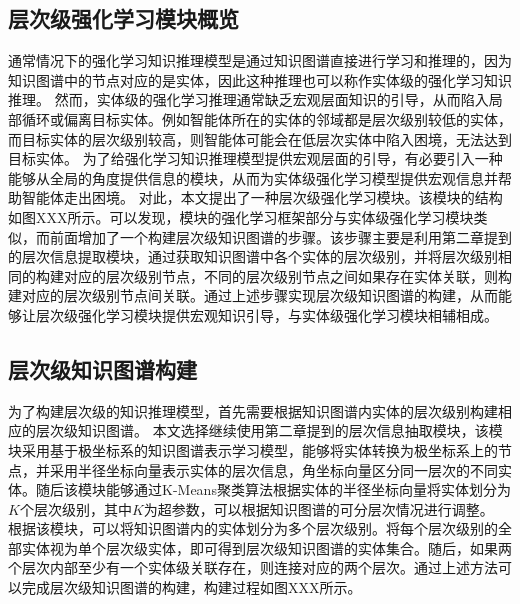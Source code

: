 \documentclass[algorithmlist, AutoFakeBold, AutoFakeSlant, figurelist, tablelist, nomlist, masters]{seuthesix}
\begin{document}
\subsection{层次级强化学习模块概览}
通常情况下的强化学习知识推理模型是通过知识图谱直接进行学习和推理的，因为知识图谱中的节点对应的是实体，因此这种推理也可以称作实体级的强化学习知识推理。
然而，实体级的强化学习推理通常缺乏宏观层面知识的引导，从而陷入局部循环或偏离目标实体。例如智能体所在的实体的邻域都是层次级别较低的实体，而目标实体的层次级别较高，则智能体可能会在低层次实体中陷入困境，无法达到目标实体。
为了给强化学习知识推理模型提供宏观层面的引导，有必要引入一种能够从全局的角度提供信息的模块，从而为实体级强化学习模型提供宏观信息并帮助智能体走出困境。
对此，本文提出了一种层次级强化学习模块。该模块的结构如图XXX所示。可以发现，模块的强化学习框架部分与实体级强化学习模块类似，而前面增加了一个构建层次级知识图谱的步骤。该步骤主要是利用第二章提到的层次信息提取模块，通过获取知识图谱中各个实体的层次级别，并将层次级别相同的构建对应的层次级别节点，不同的层次级别节点之间如果存在实体关联，则构建对应的层次级别节点间关联。通过上述步骤实现层次级知识图谱的构建，从而能够让层次级强化学习模块提供宏观知识引导，与实体级强化学习模块相辅相成。

\subsection{层次级知识图谱构建}
为了构建层次级的知识推理模型，首先需要根据知识图谱内实体的层次级别构建相应的层次级知识图谱。
本文选择继续使用第二章提到的层次信息抽取模块，该模块采用基于极坐标系的知识图谱表示学习模型，能够将实体转换为极坐标系上的节点，并采用半径坐标向量表示实体的层次信息，角坐标向量区分同一层次的不同实体。随后该模块能够通过K-Means聚类算法根据实体的半径坐标向量将实体划分为$K$个层次级别，其中$K$为超参数，可以根据知识图谱的可分层次情况进行调整。
根据该模块，可以将知识图谱内的实体划分为多个层次级别。将每个层次级别的全部实体视为单个层次级实体，即可得到层次级知识图谱的实体集合。随后，如果两个层次内部至少有一个实体级关联存在，则连接对应的两个层次。通过上述方法可以完成层次级知识图谱的构建，构建过程如图XXX所示。
\end{document}
